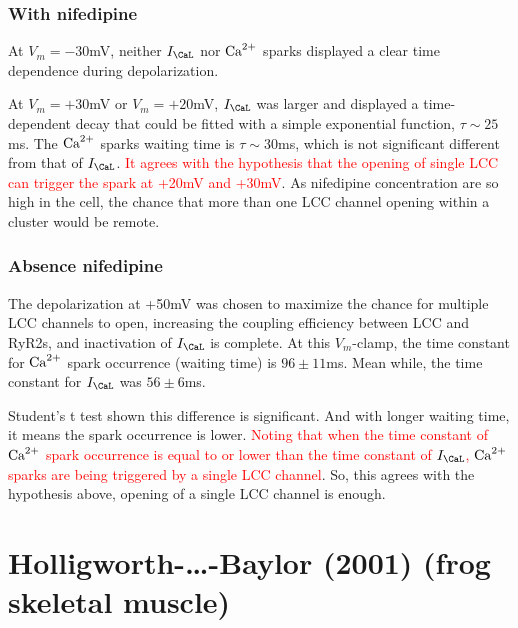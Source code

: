 \subsubsection{With nifedipine}
\label{sec:with-nifedipine}

At $V_m=-30$mV, neither $I_\CaL$ nor ${\text{Ca}^{2+}}$ sparks displayed a clear
time dependence during depolarization. 

At $V_m=+30$mV or $V_m=+20$mV, $I_\CaL$ was larger and displayed a
time-dependent decay that could be fitted with a simple exponential
function, $\tau\sim 25$ms. The ${\text{Ca}^{2+}}$ sparks waiting time is
$\tau\sim30$ms, which is not significant different from that of
$I_\CaL$.
\textcolor{red}{It agrees with the hypothesis that the opening of
  single LCC can trigger the spark at +20mV and +30mV}.
As nifedipine concentration are so high in the cell, the chance that
more than one LCC channel opening within a cluster would be remote.

\begin{framed}
\end{framed}

\subsubsection{Absence nifedipine}
\label{sec:absence-nifedipine}

The depolarization at +50mV was chosen to maximize the chance for
multiple LCC channels to open, increasing the coupling efficiency
between LCC and RyR2s, and inactivation of $I_\CaL$ is complete. At
this $V_m$-clamp, the time constant for ${\text{Ca}^{2+}}$ spark occurrence
(waiting time) is $96\pm 11$ms. Mean while, the time constant for
$I_\CaL$ was $56\pm6$ms. 

Student's t test shown this difference is significant. And with longer
waiting time, it means the spark occurrence is lower.
\textcolor{red}{Noting that when the time constant of ${\text{Ca}^{2+}}$ spark
  occurrence is equal to or lower than the time constant of $I_\CaL$,
  ${\text{Ca}^{2+}}$ sparks are being triggered by a single LCC channel}.
So, this agrees with the hypothesis above, opening of a single LCC
channel is enough.






\section{Holligworth-\ldots-Baylor (2001) (frog skeletal muscle)}
\label{sec:hollingworth-2001}

